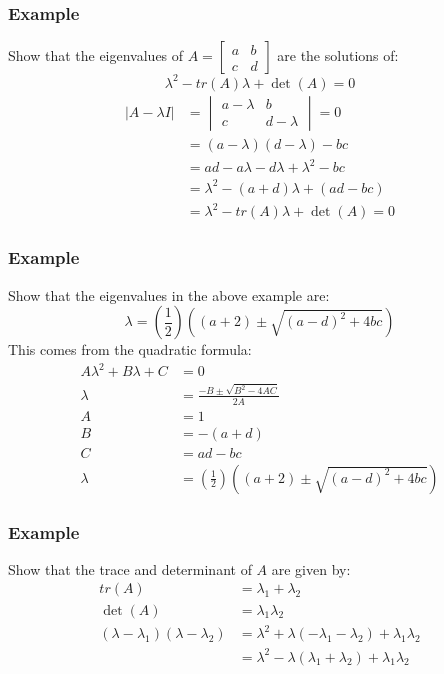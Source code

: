 \documentclass{math}
\begin{document}
\subsubsection*{Example}
Show that the eigenvalues of \( A = \begin{bmatrix}a & b \\ c & d\end{bmatrix}
\) are the solutions of:
\[ \lambda^2-tr(A)\lambda+\det(A) = 0 \]
\begin{align*}
  |A-\lambda I| &= \begin{vmatrix}
    a-\lambda & b \\
    c & d-\lambda
  \end{vmatrix}  = 0 \\
  &= (a-\lambda)(d-\lambda)-bc \\
  &= ad-a\lambda-d\lambda+\lambda^2-bc \\
  &= \lambda^2-(a+d)\lambda+(ad-bc) \\
  &= \lambda^2-tr(A)\lambda+\det(A) = 0
\end{align*}

\subsubsection*{Example}
Show that the eigenvalues in the above example are:
\[ \lambda = (\frac{1}{2})((a+2)\pm\sqrt{(a-d)^2+4bc}) \]
This comes from the quadratic formula:
\begin{align*}
  A\lambda^2+B\lambda+C &= 0 \\
  \lambda &= \frac{-B\pm\sqrt{B^2-4AC}}{2A} \\
  A &= 1 \\
  B &= -(a+d) \\
  C &= ad-bc \\
  \lambda &= (\frac{1}{2})((a+2)\pm\sqrt{(a-d)^2+4bc})
\end{align*}

\subsubsection*{Example}
Show that the trace and determinant of \( A \) are given by:
\begin{align*}
  tr(A) &= \lambda_1+\lambda_2 \\
  \det(A) &= \lambda_1\lambda_2 \\
  (\lambda-\lambda_1)(\lambda-\lambda_2) &=
    \lambda^2+\lambda(-\lambda_1-\lambda_2)+\lambda_1\lambda_2 \\
  &= \lambda^2-\lambda(\lambda_1+\lambda_2)+\lambda_1\lambda_2
\end{align*}
\end{document}
